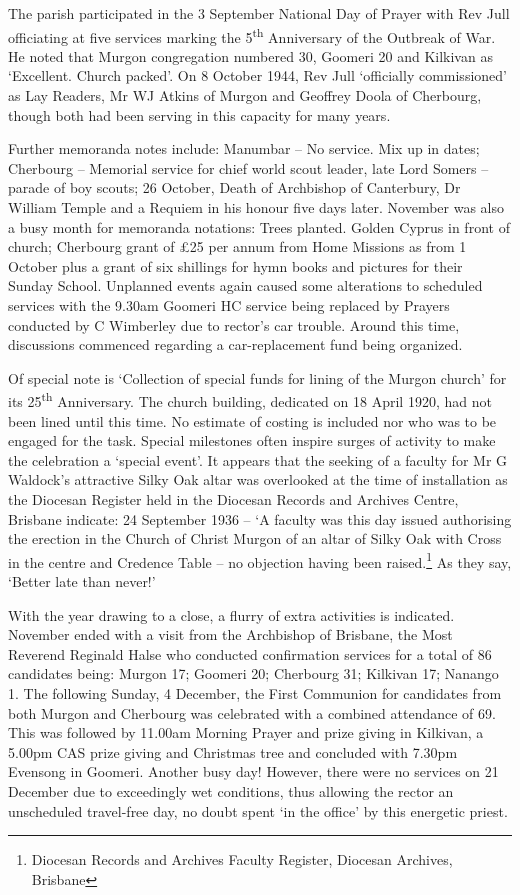 The parish participated in the 3 September National Day of Prayer with
Rev Jull officiating at five services marking the 5\textsuperscript{th}
Anniversary of the Outbreak of War. He noted that Murgon congregation
numbered 30, Goomeri 20 and Kilkivan as `Excellent. Church packed'. On 8
October 1944, Rev Jull `officially commissioned' as Lay Readers, Mr WJ
Atkins of Murgon and Geoffrey Doola of Cherbourg, though both had been
serving in this capacity for many years.

Further memoranda notes include: Manumbar -- No service. Mix up in
dates; Cherbourg -- Memorial service for chief world scout leader, late
Lord Somers -- parade of boy scouts; 26 October, Death of Archbishop of
Canterbury, Dr William Temple and a Requiem in his honour five days
later. November was also a busy month for memoranda notations: Trees
planted. Golden Cyprus in front of church; Cherbourg grant of \pounds25 per
annum from Home Missions as from 1 October plus a grant of six shillings
for hymn books and pictures for their Sunday School. Unplanned events
again caused some alterations to scheduled services with the 9.30am
Goomeri HC service being replaced by Prayers conducted by C Wimberley
due to rector's car trouble. Around this time, discussions commenced
regarding a car-replacement fund being organized.

Of special note is `Collection of special funds for lining of the Murgon
church' for its 25\textsuperscript{th} Anniversary. The church building,
dedicated on 18 April 1920, had not been lined until this time. No
estimate of costing is included nor who was to be engaged for the task.
Special milestones often inspire surges of activity to make the
celebration a `special event'. It appears that the seeking of a faculty
for Mr G Waldock's attractive Silky Oak altar was overlooked at the time
of installation as the Diocesan Register held in the Diocesan Records
and Archives Centre, Brisbane indicate: 24 September 1936 -- `A faculty
was this day issued authorising the erection in the Church of Christ
Murgon of an altar of Silky Oak with Cross in the centre and Credence
Table -- no objection having been raised.\footnote{Diocesan Records and
  Archives Faculty Register, Diocesan Archives, Brisbane} As they say,
`Better late than never!'

With the year drawing to a close, a flurry of extra activities is
indicated. November ended with a visit from the Archbishop of Brisbane,
the Most Reverend Reginald Halse who conducted confirmation services for
a total of 86 candidates being: Murgon 17; Goomeri 20; Cherbourg 31;
Kilkivan 17; Nanango 1. The following Sunday, 4 December, the First
Communion for candidates from both Murgon and Cherbourg was celebrated
with a combined attendance of 69. This was followed by 11.00am Morning
Prayer and prize giving in Kilkivan, a 5.00pm CAS prize giving and
Christmas tree and concluded with 7.30pm Evensong in Goomeri. Another
busy day! However, there were no services on 21 December due to
exceedingly wet conditions, thus allowing the rector an unscheduled
travel-free day, no doubt spent `in the office' by this energetic
priest.

